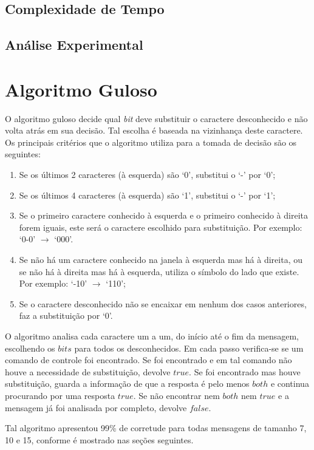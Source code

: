 \documentclass[a4paper,12pt,titlepage]{article}
\begin{document}
\subsection{Complexidade de Tempo}
\subsection{Análise Experimental}

\section{Algoritmo Guloso}

O algoritmo guloso decide qual \textit{bit} deve substituir o caractere desconhecido e não volta atrás em sua decisão. Tal escolha é baseada na vizinhança deste caractere. Os principais critérios que o algoritmo utiliza para a tomada de decisão são os seguintes:

\begin{enumerate}[leftmargin=1.5cm]
    \item Se os últimos 2 caracteres (à esquerda) são `0', substitui o `-' por `0';
    \item Se os últimos 4 caracteres (à esquerda) são `1', substitui o `-' por `1';  
    \item Se o primeiro caractere conhecido à esquerda e o primeiro conhecido à direita forem iguais, este será o caractere escolhido para substituição. Por exemplo: `0-0' $\rightarrow$ `000'. 
    \item Se não há um caractere conhecido na janela à esquerda mas há à direita, ou se não há à direita mas há à esquerda, utiliza o símbolo do lado que existe. Por exemplo: `-10' $\rightarrow$ `110'; 
    \item Se o caractere desconhecido não se encaixar em nenhum dos casos anteriores, faz a substituição por `0'.
\end{enumerate}

O algoritmo analisa cada caractere um a um, do início até o fim da mensagem, escolhendo os $bits$ para todos os desconhecidos. Em cada passo verifica-se se um comando de controle foi encontrado. Se foi encontrado e em tal comando não houve a necessidade de substituição, devolve $true$. Se foi encontrado mas houve substituição, guarda a informação de que a resposta é pelo menos $both$ e continua procurando por uma resposta $true$. Se não encontrar nem $both$ nem $true$ e a mensagem já foi analisada por completo, devolve $false$.

Tal algoritmo apresentou 99\% de corretude para todas mensagens de tamanho 7, 10 e 15, conforme é mostrado nas seções seguintes.
\end{document}
